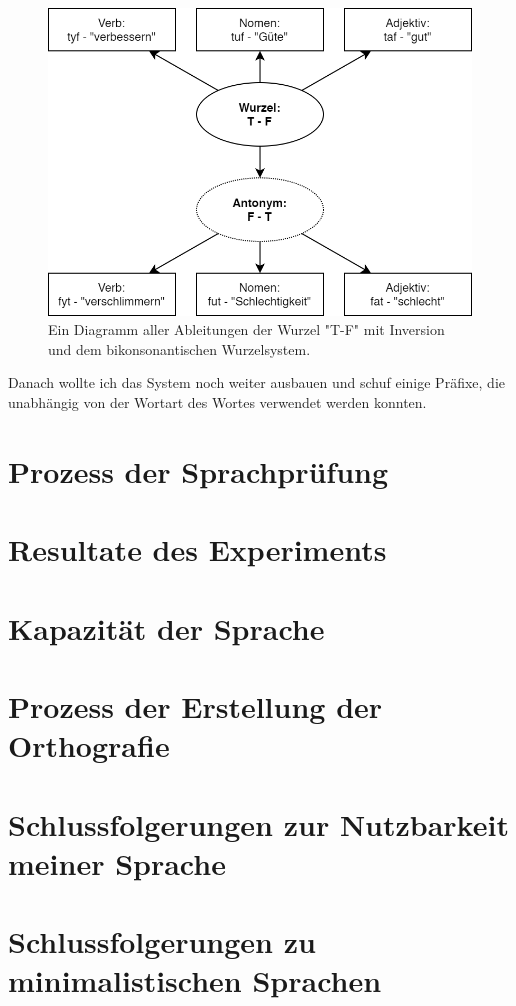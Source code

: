 \documentclass{article}
\begin{document}
\begin{figure}
	\centering
	\includegraphics[scale=0.33]{root_derivations_1.png}
	\caption{Ein Diagramm aller Ableitungen der Wurzel "T-F" mit Inversion und dem bikonsonantischen Wurzelsystem.}
	\label{root_derivations_1}
\end{figure}

Danach wollte ich das System noch weiter ausbauen und schuf einige Präfixe, die unabhängig von der Wortart des Wortes
verwendet werden konnten.


\section{Prozess der Sprachprüfung}



\section{Resultate des Experiments}



\section{Kapazität der Sprache}



\section{Prozess der Erstellung der Orthografie}



\section{Schlussfolgerungen zur Nutzbarkeit meiner Sprache}



\section{Schlussfolgerungen zu minimalistischen Sprachen}




\end{document}
